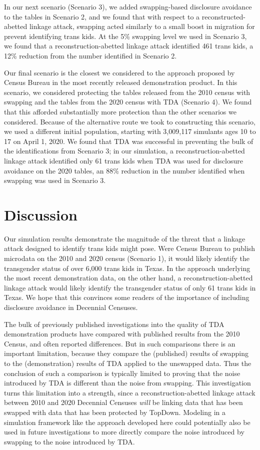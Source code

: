\documentclass{jpc} %
\theoremstyle{plain}\newtheorem{satz}[thm]{Satz} %
\begin{document}
In our next scenario (Scenario 3), we added swapping-based disclosure avoidance to the tables in Scenario 2, and we found that with respect to a reconstructed-abetted linkage attack, swapping acted similarly to a small boost in migration for prevent identifying trans kids.  At the 5\% swapping level we used in Scenario 3, we found that a reconstruction-abetted linkage attack identified 461 trans kids, a 12\% reduction from the number identified in Scenario 2.

Our final scenario is the closest we considered to the approach proposed by Census Bureau in the most recently released demonstration product. In this scenario, we considered protecting the tables released from the 2010 census with swapping and the tables from the 2020 census with TDA (Scenario 4).  We found that this afforded substantially more protection than the other scenarios we considered.  Because of the alternative route we took to constructing this scenario, we used a different initial population, starting with 3,009,117 simulants ages 10 to 17 on April 1, 2020.  We found that TDA was successful in preventing the bulk of the identifications from Scenario 3; in our simulation, a reconstruction-abetted linkage attack identified only 61 trans kids when TDA was used for disclosure avoidance on the 2020 tables, an 88\% reduction in the number identified when swapping was used in Scenario 3.

\section{Discussion}

Our simulation results demonstrate the magnitude of the threat that a linkage attack designed to identify trans kids might pose.  Were Census Bureau to publish microdata on the 2010 and 2020 census (Scenario 1), it would likely identify the transgender status of over 6,000 trans kids in Texas.  In the approach underlying the most recent demonstration data, on the other hand, a reconstruction-abetted linkage attack would likely identify the transgender status of only 61 trans kids in Texas.  We hope that this convinces some readers of the importance of including disclosure avoidance in Decennial Censuses.

The bulk of previously published investigations into the quality of TDA demonstration products have compared with published results from the 2010 Census, and often reported differences.  But in such comparisons there is an important limitation, because they compare the (published) results of swapping to the (demonstration) results of TDA applied to the unswapped data.  Thus the conclusion of such a comparison is typically limited to proving that the noise introduced by TDA is different than the noise from swapping.
This investigation turns this limitation into a strength, since a reconstruction-abetted linkage attack between 2010 and 2020 Decennial Censuses \emph{will} be linking data that has been swapped with data that has been protected by TopDown.
Modeling in a simulation framework like the approach developed here could potentially also be used in future investigations to more directly compare the noise introduced by swapping to the noise introduced by TDA.
\end{document}

